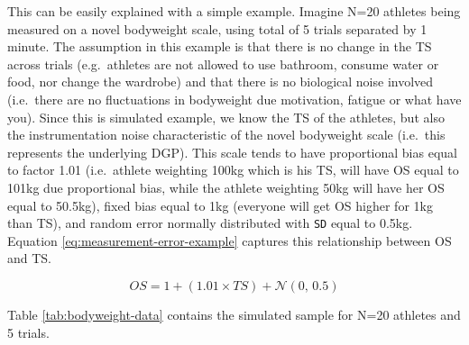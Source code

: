 \documentclass[
]{book}
\begin{document}
This can be easily explained with a simple example. Imagine N=20 athletes being measured on a novel bodyweight scale, using total of 5 trials separated by 1 minute. The assumption in this example is that there is no change in the TS across trials (e.g.~athletes are not allowed to use bathroom, consume water or food, nor change the wardrobe) and that there is no biological noise involved (i.e.~there are no fluctuations in bodyweight due motivation, fatigue or what have you). Since this is simulated example, we know the TS of the athletes, but also the instrumentation noise characteristic of the novel bodyweight scale (i.e.~this represents the underlying DGP). This scale tends to have proportional bias equal to factor 1.01 (i.e.~athlete weighting 100kg which is his TS, will have OS equal to 101kg due proportional bias, while the athlete weighting 50kg will have her OS equal to 50.5kg), fixed bias equal to 1kg (everyone will get OS higher for 1kg than TS), and random error normally distributed with \texttt{SD} equal to 0.5kg. Equation \eqref{eq:measurement-error-example} captures this relationship between OS and TS.

\begin{equation}
  OS = 1 + (1.01 \times TS) + \mathcal{N}(0,\, 0.5) 
  \label{eq:measurement-error-example}
\end{equation}

Table \ref{tab:bodyweight-data} contains the simulated sample for N=20 athletes and 5 trials.
\end{document}
